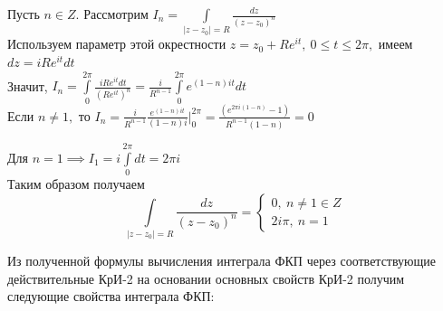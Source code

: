 \documentclass[../../main.tex]{subfiles}
\begin{document}
\begin{example}
    Пусть $n \in Z.$ Рассмотрим 
    $I_n = \int\limits_{|z-z_0| = R}{\frac{dz}{\left(z-z_0\right)^n}}$\\
    Используем параметр этой окрестности $z=z_0 + R e^{it}, \
    0 \leq t \leq 2\pi,$ имеем
    $dz = iRe^{it}dt$\\
    Значит, $I_n = \int\limits_0^{2\pi}{\frac{iRe^{it}dt}{
    (R e^{it})^n}} = \frac{i}{R^{n-1}}\int\limits_0^{2\pi}{
    e^{(1-n)it}dt}$\\
    Если $n \neq 1, $ то $I_n = \frac{i}{R^{n-1}}\frac{
    e^{(1-n)it}}{(1-n)i}\bigg|_0^{2\pi} = \frac{
    (e^{2\pi i(1-n)}-1)}{R^{n-1}(1-n)} = 0$
    
    Для $n=1 \implies I_1 = i\int\limits_0^{2\pi}{dt} = 2\pi i$\\
    Таким образом получаем 
    \begin{equation}
        \label{lec30_2:6}
        \int\limits_{|z-z_0| = R}{\frac{dz}{(z-z_0)^n}} = 
        \begin{cases}
            0,\ n \neq 1 \in Z\\
            2i\pi,\ n = 1
        \end{cases}
    \end{equation}
\end{example}

Из полученной формулы вычисления интеграла ФКП через соответствующие
действительные КрИ-2 на основании основных свойств КрИ-2 получим 
следующие свойства интеграла ФКП:
\end{document}
